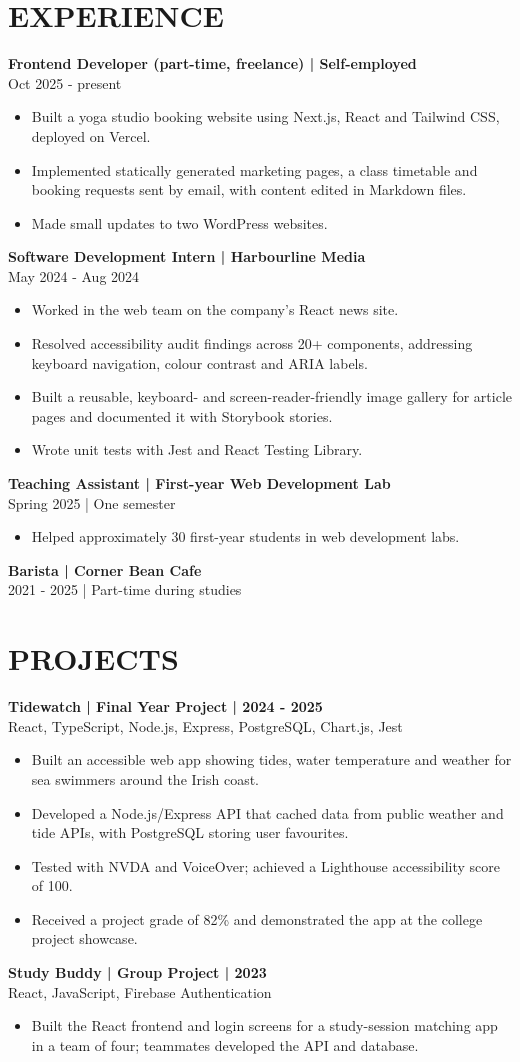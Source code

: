 \documentclass[11pt,a4paper]{article}
\newcommand{\cvsection}[1]{\section*{#1}}
\newcommand{\cvrole}[2]{\par\textbf{#1}\\#2\par}
\begin{document}
\cvsection{EXPERIENCE}
\cvrole{Frontend Developer (part-time, freelance) | Self-employed}{Oct 2025 - present}
\begin{itemize}
\item Built a yoga studio booking website using Next.js, React and Tailwind CSS, deployed on Vercel.
\item Implemented statically generated marketing pages, a class timetable and booking requests sent by email, with content edited in Markdown files.
\item Made small updates to two WordPress websites.
\end{itemize}
\cvrole{Software Development Intern | Harbourline Media}{May 2024 - Aug 2024}
\begin{itemize}
\item Worked in the web team on the company's React news site.
\item Resolved accessibility audit findings across 20+ components, addressing keyboard navigation, colour contrast and ARIA labels.
\item Built a reusable, keyboard- and screen-reader-friendly image gallery for article pages and documented it with Storybook stories.
\item Wrote unit tests with Jest and React Testing Library.
\end{itemize}
\cvrole{Teaching Assistant | First-year Web Development Lab}{Spring 2025 | One semester}
\begin{itemize}
\item Helped approximately 30 first-year students in web development labs.
\end{itemize}
\cvrole{Barista | Corner Bean Cafe}{2021 - 2025 | Part-time during studies}

\newpage
\cvsection{PROJECTS}
\textbf{Tidewatch | Final Year Project | 2024 - 2025}\\
React, TypeScript, Node.js, Express, PostgreSQL, Chart.js, Jest
\begin{itemize}
\item Built an accessible web app showing tides, water temperature and weather for sea swimmers around the Irish coast.
\item Developed a Node.js/Express API that cached data from public weather and tide APIs, with PostgreSQL storing user favourites.
\item Tested with NVDA and VoiceOver; achieved a Lighthouse accessibility score of 100.
\item Received a project grade of 82\% and demonstrated the app at the college project showcase.
\end{itemize}
\textbf{Study Buddy | Group Project | 2023}\\
React, JavaScript, Firebase Authentication
\begin{itemize}
\item Built the React frontend and login screens for a study-session matching app in a team of four; teammates developed the API and database.
\end{itemize}
\end{document}
